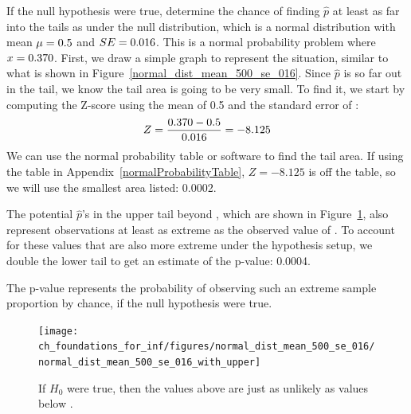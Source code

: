 \begin{examplewrap}
\begin{nexample}{If the null hypothesis were true,
    determine the chance of finding $\hat{p}$ at least
    as far into the tails as \pewcoalpollprop{}
    under the null distribution,
    which is a normal distribution with mean
    $\mu = 0.5{}$
    and $SE = 0.016{}$.}
%
  This is a normal probability problem where
  $x = 0.370{}$.
  First, we draw a simple graph to represent the situation,
  similar to what is shown in
  Figure~\ref{normal_dist_mean_500_se_016}.
  Since $\hat{p}$ is so far out in the tail, we know the
  tail area is going to be very small. To find it, we start
  by computing the Z-score using the mean of 0.5 and the
  standard error of \pewcoalpollnullse{}:
  \begin{align*}
  Z = \frac{0.370{} - 0.5}{0.016{}} = -8.125 
  \end{align*}
  We can use the normal probability table or software to find
  the tail area.
  If using the table in
  Appendix~\ref{normalProbabilityTable},
  $Z = -8.125$ is off the table, so we will
  use the smallest area listed: 0.0002.

  The potential $\hat{p}$'s in the upper tail beyond
  \pewcoalpollpropcomplement{}, which are shown
  in Figure~\ref{normal_dist_mean_500_se_016_with_upper},
  also represent observations at least as extreme as
  the observed value of \pewcoalpollprop{}.
  To account for these values that are also more
  extreme under the hypothesis setup,
  we double the lower tail to get an estimate
  of the p-value: 0.0004.

  The p-value represents the probability of observing
  such an extreme sample proportion by chance, if the null
  hypothesis were true.
\end{nexample}
\end{examplewrap}

\begin{figure}[h]
\centering
\texttt{[image: ch\_foundations\_for\_inf/figures/normal\_dist\_mean\_500\_se\_016/normal\_dist\_mean\_500\_se\_016\_with\_upper]}
\caption{
  If $H_0$ were true, then the values above
  \pewcoalpollpropcomplement{} are just
  as unlikely as values below \pewcoalpollprop{}.}
\label{normal_dist_mean_500_se_016_with_upper}
\end{figure}




